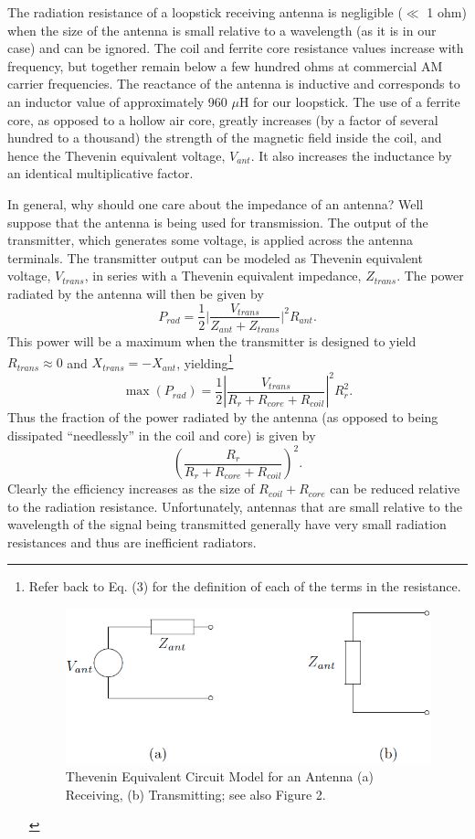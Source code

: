 \documentclass[a4paper]{article}
\begin{document}
The radiation resistance of a loopstick receiving antenna is negligible ($\ll$ 1 ohm) when the size of the antenna is small relative to a wavelength (as it is in our case) and can be ignored. The coil and ferrite core resistance values increase with frequency, but together remain below a few hundred ohms at commercial AM carrier frequencies. The reactance of the antenna is inductive and corresponds to an inductor value of approximately 960 $\mu$H for our loopstick. The use of a ferrite core, as opposed to a hollow air core, greatly increases (by a factor of several hundred to a thousand) the strength of the magnetic field inside the coil, and hence the Thevenin equivalent voltage, $V_{ant}$. It also increases the inductance by an identical multiplicative factor.

In general, why should one care about the impedance of an antenna? Well suppose that the antenna is being used for transmission. The output of the transmitter, which generates some voltage, is applied across the antenna terminals. The transmitter output can be modeled as Thevenin equivalent voltage, $V_{trans}$, in series with a Thevenin equivalent impedance, $Z_{trans}$. The power radiated by the antenna will then be given by
\begin{equation}
	P_{rad}=\frac{1}{2}\bigg|\frac{V_{trans}}{Z_{ant}+Z_{trans}}\bigg|^2R_{ant}.
\end{equation}
This power will be a maximum when the transmitter is designed to yield $R_{trans}\approx0$ and $X_{trans}=-X_{ant}$, yielding\footnote{Refer back to Eq. (3) for the definition of each of the terms in the resistance.\begin{figure}[H]\centering\includegraphics[width=0.7\linewidth]{6.png}\caption{Thevenin Equivalent Circuit Model for an Antenna (a) Receiving, (b) Transmitting; see also Figure 2.}\end{figure}}
\begin{equation}
	\max{(P_{rad})}=\frac{1}{2}|\frac{V_{trans}}{R_r+R_{core}+R_{coil}}|^2R_r^2.
\end{equation}
Thus the fraction of the power radiated by the antenna (as opposed to being dissipated “needlessly” in the coil and core) is given by
$$(\frac{R_r}{R_r+R_{core}+R_{coil}})^2.$$
Clearly the efficiency increases as the size of $R_{coil}+R_{core}$ can be reduced relative to the radiation resistance. Unfortunately, antennas that are small relative to the wavelength of the signal being transmitted generally have very small radiation resistances and thus are inefficient radiators.
\end{document}
